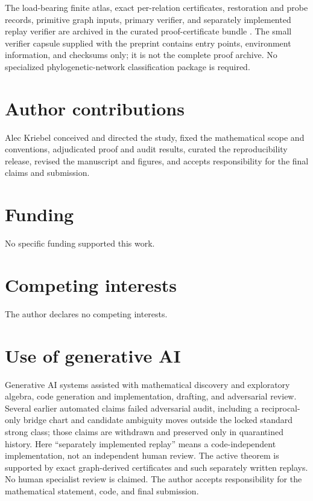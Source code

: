 \documentclass[11pt]{article}
\theoremstyle{remark}
\begin{document}
The load-bearing finite atlas, exact per-relation certificates, restoration
and probe records, primitive graph inputs, primary verifier, and separately
implemented replay verifier are archived in the curated proof-certificate
bundle \cite{KriebelAtlas2026}.  The small verifier capsule supplied
with the preprint contains entry points, environment information, and
checksums only; it is not the complete proof archive.  No specialized
phylogenetic-network classification package is required.

\section*{Author contributions}

Alec Kriebel conceived and directed the study, fixed the mathematical scope
and conventions, adjudicated proof and audit results, curated the
reproducibility release, revised the manuscript and figures, and accepts
responsibility for the final claims and submission.

\section*{Funding}

No specific funding supported this work.

\section*{Competing interests}

The author declares no competing interests.

\section*{Use of generative AI}

Generative AI systems assisted with mathematical discovery and exploratory
algebra, code generation and implementation, drafting, and adversarial
review.  Several earlier automated claims failed adversarial audit, including
a reciprocal-only bridge chart and candidate ambiguity moves outside the
locked standard strong class; those claims are withdrawn and preserved only
in quarantined history.  Here ``separately implemented replay'' means a code-independent
implementation, not an independent human review.  The active theorem is
supported by exact graph-derived certificates and such separately written
replays.  No human specialist review is claimed.  The author accepts
responsibility for the mathematical statement, code, and final submission.

{\small


}
\end{document}
